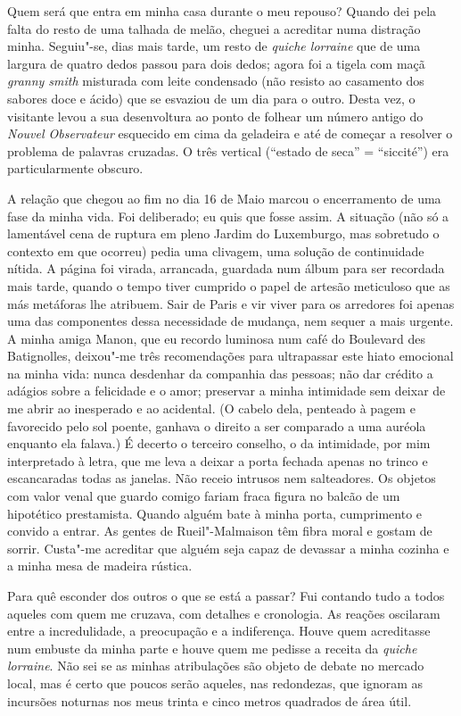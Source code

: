 Quem será que entra em minha casa durante o meu repouso? Quando dei
pela falta do resto de uma talhada de melão, cheguei a acreditar numa
distração minha. Seguiu"-se, dias mais tarde, um resto de \emph{quiche lorraine }que de uma
largura de quatro dedos passou para dois dedos; agora foi a tigela com
maçã \emph{granny smith }misturada com leite condensado (não resisto ao
casamento dos sabores doce e ácido) que se esvaziou de um dia para o
outro. Desta vez, o visitante levou a sua desenvoltura ao ponto de
folhear um número antigo do \emph{Nouvel Observateur }esquecido em cima
da geladeira e até de começar a resolver o problema de palavras
cruzadas. O três vertical (``estado de seca'' = ``siccité'') era
particularmente obscuro.

A relação que chegou ao fim no dia 16 de Maio marcou o encerramento de
uma fase da minha vida. Foi deliberado; eu quis que fosse assim. A
situação (não só a lamentável cena de ruptura em pleno Jardim do
Luxemburgo, mas sobretudo o contexto em que ocorreu) pedia uma clivagem,
uma solução de continuidade nítida. A página foi virada, arrancada,
guardada num álbum para ser recordada mais tarde, quando o tempo tiver
cumprido o papel de artesão meticuloso que as más metáforas lhe
atribuem. Sair de Paris e vir viver para os arredores foi apenas uma das
componentes dessa necessidade de mudança, nem sequer a mais urgente. A
minha amiga Manon, que eu recordo luminosa num café do Boulevard des
Batignolles, deixou"-me três recomendações para ultrapassar este hiato
emocional na minha vida: nunca desdenhar da companhia das pessoas; não
dar crédito a adágios sobre a felicidade e o amor; preservar a minha
intimidade sem deixar de
me abrir ao inesperado e ao acidental. (O cabelo dela, penteado à
pagem e favorecido pelo sol poente, ganhava o direito a ser comparado a
uma auréola enquanto ela falava.) É decerto o terceiro conselho, o da
intimidade, por mim interpretado à letra, que me leva a deixar a porta
fechada apenas no trinco e escancaradas todas as janelas. Não receio
intrusos nem salteadores. Os objetos com valor venal que guardo
comigo fariam fraca figura no balcão de um hipotético prestamista.
Quando alguém bate à minha porta, cumprimento e convido a entrar. As
gentes de Rueil"-Malmaison têm fibra moral e gostam de sorrir. Custa"-me
acreditar que alguém seja capaz de devassar a minha cozinha e a minha
mesa de madeira rústica.

Para quê esconder dos outros o que se está a passar? Fui contando tudo a
todos aqueles com quem me cruzava, com detalhes e cronologia. As
reações oscilaram entre a incredulidade, a preocupação e a
indiferença. Houve quem acreditasse num embuste da minha parte e houve
quem me pedisse a receita da \emph{quiche lorraine}. Não sei se as
minhas atribulações são objeto de debate no mercado local, mas é certo
que poucos serão aqueles, nas redondezas, que ignoram as incursões
noturnas nos meus trinta e cinco metros quadrados de área útil.

